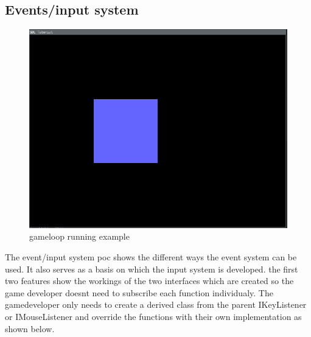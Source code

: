 \documentclass{projdoc}
\begin{document}
\subsection{Events/input system}
\label{poc:Event}
\begin{figure}
	\centering
	\includegraphics[scale=0.4]{img/poc-button.png}
	\caption{gameloop running example}
	\label{fig:poc-event}
\end{figure}
The event/input system \gls{poc} shows the different ways the event system can be used. It also serves as a basis on which the input system is developed.
the first two features show the workings of the two interfaces which are created so the game developer doesnt need to subscribe each function individualy.
The gamedeveloper only needs to create a derived class from the parent IKeyListener or IMouseListener and override the functions with their own implementation as shown below.
\end{document}
